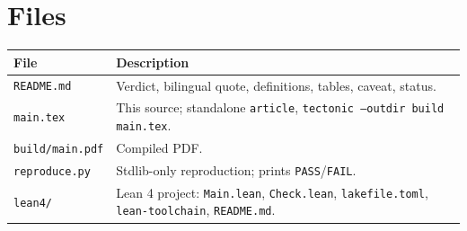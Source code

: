 \documentclass[11pt]{article}
\theoremstyle{definition}
\theoremstyle{remark}
\newcommand{\code}[1]{\texttt{#1}}
\begin{document}
\section*{Files}

\begin{tabular}{@{}p{}p{}@{}}
\toprule
File & Description\\
\midrule
\code{README.md} & Verdict, bilingual quote, definitions, tables, caveat, status.\\
\code{main.tex} & This source; standalone \code{article}, \code{tectonic --outdir build main.tex}.\\
\code{build/main.pdf} & Compiled PDF.\\
\code{reproduce.py} & Stdlib-only reproduction; prints \code{PASS}/\code{FAIL}.\\
\code{lean4/} & Lean 4 project: \code{Main.lean}, \code{Check.lean}, \code{lakefile.toml}, \code{lean-toolchain}, \code{README.md}.\\
\bottomrule
\end{tabular}
\end{document}
